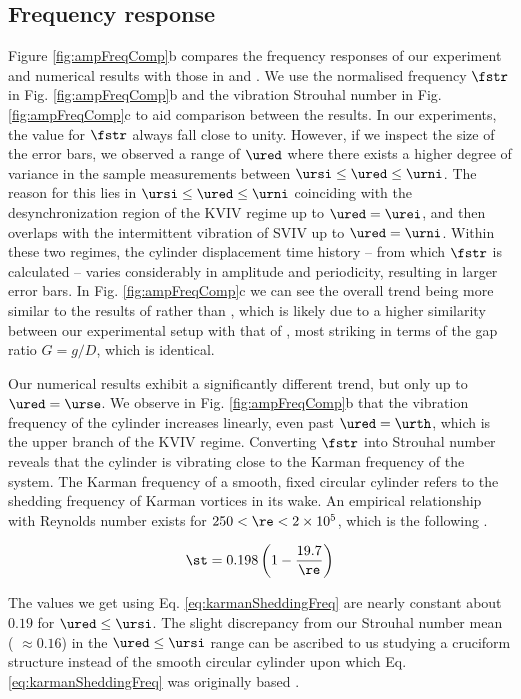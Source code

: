 \documentclass[a4paper,fleqn]{cas-sc}
\begin{document}
\subsection{Frequency response} \label{ssec:freResp}
Figure \ref{fig:ampFreqComp}b compares the frequency responses of our experiment and numerical results with those in \citet{Nguyen2012} and \citet{Koide2013}. We use the normalised frequency  $\fstr$ in Fig. \ref{fig:ampFreqComp}b and the vibration Strouhal number in Fig. \ref{fig:ampFreqComp}c to aid comparison between the results. In our experiments, the value for  $\fstr$ always fall close to unity. However, if we inspect the size of the error bars, we observed a range of  $\ured$ where there exists a higher degree of variance in the sample measurements between  $\ursi \leq \ured \leq \urni$. The reason for this lies in  $\ursi \leq \ured \leq \urni$ coinciding with the desynchronization region of the KVIV regime up to  $\ured = \urei$, and then overlaps with the intermittent vibration of SVIV up to  $\ured = \urni$. Within these two regimes, the cylinder displacement time history -- from which  $\fstr$ is calculated -- varies considerably in amplitude and periodicity, resulting in larger error bars. In Fig. \ref{fig:ampFreqComp}c we can see the overall trend being more similar to the results of \citet{Koide2013} rather than \citet{Nguyen2012}, which is likely due to a higher similarity between our experimental setup with that of \citet{Koide2013}, most striking in terms of the gap ratio  $G = g/D$, which is identical.

Our numerical results exhibit a significantly different trend, but only up to  $\ured = \urse$. We observe in Fig. \ref{fig:ampFreqComp}b that the vibration frequency of the cylinder increases linearly, even past  $\ured = \urth$, which is the upper branch of the KVIV regime. Converting  $\fstr$ into Strouhal number reveals that the cylinder is vibrating close to the Karman frequency of the system. The Karman frequency of a smooth, fixed circular cylinder refers to the shedding frequency of Karman vortices in its wake. An empirical relationship with Reynolds number exists for  $250 < \re < 2 \times 10^{5}$, which is the following \citet{Blevins1990}.

\begin{equation}
  \st = 0.198 \left( 1 - \frac{19.7}{\re} \right)
  \label{eq:karmanSheddingFreq}
\end{equation}

The values we get using Eq. \ref{eq:karmanSheddingFreq} are nearly constant about $0.19$ for  $\ured \leq \ursi$. The slight discrepancy from our Strouhal number mean ( $\approx 0.16$) in the   $\ured \leq \ursi$ range can be ascribed to us studying a cruciform structure instead of the smooth circular cylinder upon which Eq. \ref{eq:karmanSheddingFreq} was originally based \citep{Blevins1990}.
\end{document}
